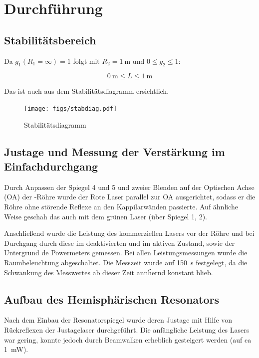 \documentclass[slug=GL, room=HZDR\ Dresden/Rossendorf\,\ Geb.\ 620/123, supervisor=Tim\ Ziegler]{../../Lab_Report_LaTeX/lab_report}
\begin{document}
\section{Durchf\"uhrung}
\label{sec:durch}

\subsection{Stabilit\"atsbereich}
\label{sec:stabber}

Da \(g_1(R_1=\infty)=1\) folgt mit \(R_2=\SI{1}{\meter}\) und \(0\leq g_2\leq 1\):

\begin{equation}
  \label{eq:stabber}
  \SI{0}{\meter}\leq L \leq \SI{1}{\meter}
\end{equation}

Das ist auch aus dem Stabilit\"atsdiagramm ersichtlich.
\begin{figure}[b]\centering
  \texttt{[image: figs/stabdiag.pdf]}
  \caption[Gauss]{Stabilit\"atsdiagramm}
  \label{fig:stabdiag}
\end{figure}

\subsection{Justage und Messung der Verst\"arkung im Einfachdurchgang}
\label{sec:justage}

Durch Anpassen der Spiegel 4 und 5 und zweier Blenden auf der
Optischen Achse (OA) der -R\"ohre wurde der Rote Laser
parallel zur OA ausgerichtet, sodass er die R\"ohre ohne st\"orende
Reflexe an den Kappilarw\"anden passierte. Auf \"ahnliche Weise
geschah das auch mit dem gr\"unen Laser (\"uber Spiegel 1, 2).

Anschlie\ss{}end wurde die Leistung des kommerziellen Lasers vor der
R\"ohre und bei Durchgang durch diese im deaktivierten und im aktiven
Zustand, sowie der Untergrund de Powermeters gemessen. Bei allen
Leistungsmessungen wurde die Raumbeleuchtung abgeschaltet. Die
Messzeit wurde auf \SI{150}{\second} festgelegt, da die Schwankung
des Messwertes ab dieser Zeit ann\"hernd konstant blieb.

\subsection{Aufbau des Hemisph\"arischen Resonators}
\label{sec:aufbauhemi}

Nach dem Einbau der Resonatorspiegel wurde deren Justage mit Hilfe von
R\"uckreflexen der Justagelaser durchgef\"uhrt. Die anf\"angliche
Leistung des Lasers war gering, konnte jedoch durch Beamwalken
erheblich gesteigert werden (auf ca \SI{1}{\milli\watt}).
\end{document}
